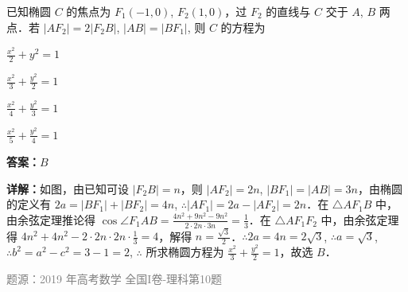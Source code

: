 \begin{question}
已知椭圆 $C$ 的焦点为 $F_1(-1, 0)$, $F_2(1, 0)$，过 $F_2$ 的直线与 $C$ 交于 $A$, $B$ 两点．若 $|AF_2| = 2|F_2B|$, $|AB| = |BF_1|$, 则 $C$ 的方程为
\begin{choices}
\item $\frac{x^2}{2} + y^2 = 1$
\item $\frac{x^2}{3} + \frac{y^2}{2} = 1$
\item $\frac{x^2}{4} + \frac{y^2}{3} = 1$
\item $\frac{x^2}{5} + \frac{y^2}{4} = 1$
\end{choices}
\begin{solution}
\textbf{答案：}$B$

\textbf{详解：}如图，由已知可设 $|F_2B| = n$，则 $|AF_2| = 2n$, $|BF_1| = |AB| = 3n$，由椭圆的定义有 $2a = |BF_1| + |BF_2| = 4n$, $\therefore |AF_1| = 2a - |AF_2| = 2n$．在 $\triangle AF_1B$ 中，由余弦定理推论得 $\cos \angle F_1AB = \frac{4n^2 + 9n^2 - 9n^2}{2 \cdot 2n \cdot 3n} = \frac{1}{3}$．在 $\triangle AF_1F_2$ 中，由余弦定理得 $4n^2 + 4n^2 - 2 \cdot 2n \cdot 2n \cdot \frac{1}{3} = 4$，解得 $n = \frac{\sqrt{3}}{2}$．$\therefore 2a = 4n = 2\sqrt{3}$, $\therefore a = \sqrt{3}$, $\therefore b^2 = a^2 - c^2 = 3 - 1 = 2$, $\therefore$ 所求椭圆方程为 $\frac{x^2}{3} + \frac{y^2}{2} = 1$，故选 $B$．

\textcolor{gray}{\footnotesize 题源：2019 年高考数学 全国I卷-理科第10题}
\end{solution}
\end{question}

